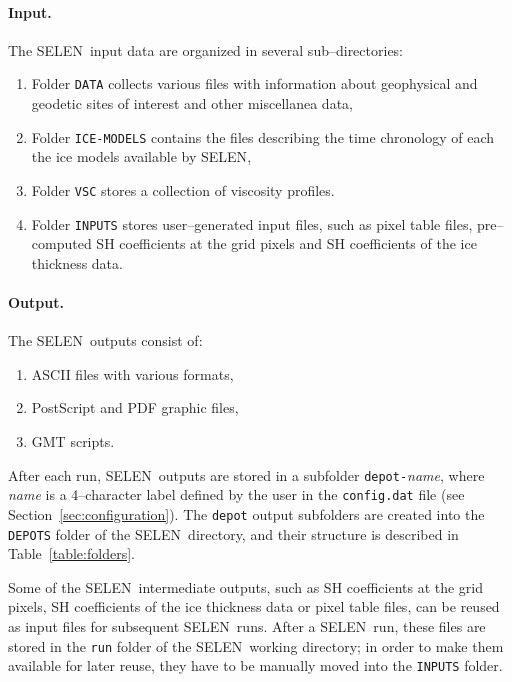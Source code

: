 \documentclass[11pt,fleqn,a4paper,titlepage]{article}
\newcommand\selen{\textsf{SELEN~}}
\newcommand\selens{\textsf{SELEN}}
\begin{document}
{\paragraph{Input.} The \selen input data are organized in several sub--directories:  
\begin{enumerate}
\item Folder {\texttt{DATA}} collects various files with information about geophysical and geodetic sites of interest and other miscellanea data, 
\item Folder {\texttt{ICE-MODELS}} contains the files describing the time chronology of each the ice models available by \selens,
\item Folder {\texttt{VSC}} stores a collection of viscosity profiles. 
\item Folder {\texttt{INPUTS}} stores user--generated input files, such as pixel table files, pre--computed SH coefficients at the grid pixels and SH coefficients of the ice thickness data. 
\end{enumerate}

\paragraph{Output.} 
The \selen outputs consist of:
\begin{enumerate}
\item ASCII files with various formats, 
\item PostScript and PDF graphic files, 
\item GMT scripts.
\end{enumerate}
\noindent After each run, \selen outputs are stored in a subfolder \texttt{depot-}\textit{name}, where \textit{name} is a 4--character label defined by the user in the \texttt{config.dat} file (see Section~\ref{sec:configuration}). The \texttt{depot} output subfolders are created into the \texttt{DEPOTS} folder of the \selen directory, and their structure is described in 
Table~\ref{table:folders}. 

Some of the \selen intermediate outputs, such as SH coefficients at the grid pixels, SH coefficients of the ice thickness data or pixel table files, can be reused as input files for subsequent \selen runs.  After a \selen run, these files are stored in the \texttt{run} folder of the \selen working directory; in order to make them available for later reuse, they have to be manually moved into the \texttt{INPUTS} folder.

\clearpage

}
\end{document}
